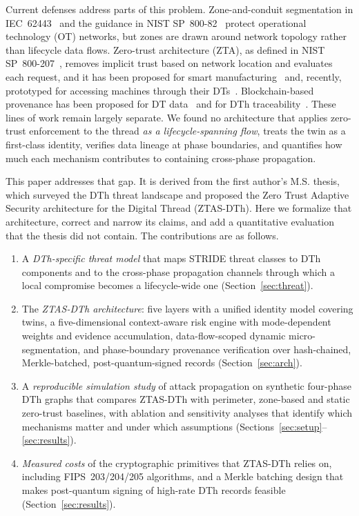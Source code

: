 \documentclass[journal]{IEEEtran}
\newcommand{\ztas}{ZTAS-DTh}
\begin{document}
Current defenses address parts of this problem. Zone-and-conduit segmentation in IEC~62443~\cite{iec62443} and the guidance in NIST SP~800-82~\cite{stouffer2023ics} protect operational technology (OT) networks, but zones are drawn around network topology rather than lifecycle data flows. Zero-trust architecture (ZTA), as defined in NIST SP~800-207~\cite{rose2020zta}, removes implicit trust based on network location and evaluates each request, and it has been proposed for smart manufacturing~\cite{paul2023zt} and, recently, prototyped for accessing machines through their DTs~\cite{fogli2025zta}. Blockchain-based provenance has been proposed for DT data~\cite{suhail2022bdt} and for DTh traceability~\cite{krima2019dth,kuo2026multiplex}. These lines of work remain largely separate. We found no architecture that applies zero-trust enforcement to the thread \emph{as a lifecycle-spanning flow}, treats the twin as a first-class identity, verifies data lineage at phase boundaries, and quantifies how much each mechanism contributes to containing cross-phase propagation.

This paper addresses that gap. It is derived from the first author's M.S. thesis, which surveyed the DTh threat landscape and proposed the Zero Trust Adaptive Security architecture for the Digital Thread (\ztas{}). Here we formalize that architecture, correct and narrow its claims, and add a quantitative evaluation that the thesis did not contain. The contributions are as follows.
\begin{enumerate}
\item A \emph{DTh-specific threat model} that maps STRIDE threat classes to DTh components and to the cross-phase propagation channels through which a local compromise becomes a lifecycle-wide one (Section~\ref{sec:threat}).
\item The \emph{\ztas{} architecture}: five layers with a unified identity model covering twins, a five-dimensional context-aware risk engine with mode-dependent weights and evidence accumulation, data-flow-scoped dynamic micro-segmentation, and phase-boundary provenance verification over hash-chained, Merkle-batched, post-quantum-signed records (Section~\ref{sec:arch}).
\item A \emph{reproducible simulation study} of attack propagation on synthetic four-phase DTh graphs that compares \ztas{} with perimeter, zone-based and static zero-trust baselines, with ablation and sensitivity analyses that identify which mechanisms matter and under which assumptions (Sections~\ref{sec:setup}--\ref{sec:results}).
\item \emph{Measured costs} of the cryptographic primitives that \ztas{} relies on, including FIPS~203/204/205 algorithms, and a Merkle batching design that makes post-quantum signing of high-rate DTh records feasible (Section~\ref{sec:results}).
\end{enumerate}
\end{document}
